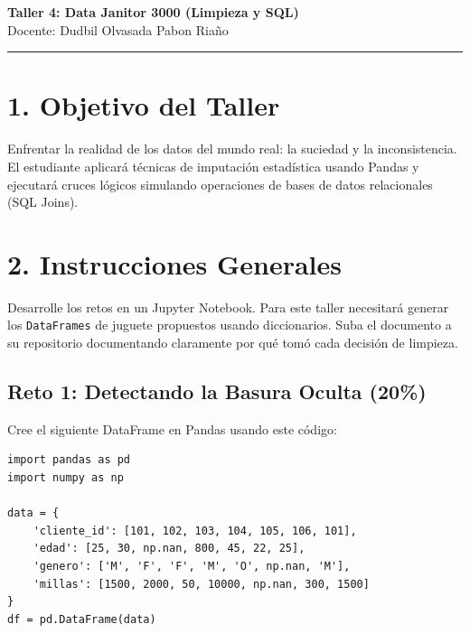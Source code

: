 \documentclass[12pt,a4paper]{article}
\begin{document}
\begin{center}
    {\huge \textcolor{unabblue}{\textbf{Taller 4: Data Janitor 3000 (Limpieza y SQL)}}} \\[0.5cm]
    {\large Docente: Dudbil Olvasada Pabon Riaño} \\[0.2cm]
    \rule{\textwidth}{1pt}
\end{center}

\vspace{0.5cm}

\section*{\textcolor{unabblue}{1. Objetivo del Taller}}
Enfrentar la realidad de los datos del mundo real: la suciedad y la inconsistencia. El estudiante aplicará técnicas de imputación estadística usando Pandas y ejecutará cruces lógicos simulando operaciones de bases de datos relacionales (SQL Joins).

\section*{\textcolor{unabblue}{2. Instrucciones Generales}}
Desarrolle los retos en un Jupyter Notebook. Para este taller necesitará generar los \texttt{DataFrames} de juguete propuestos usando diccionarios. Suba el documento a su repositorio documentando claramente por qué tomó cada decisión de limpieza.

\vspace{0.5cm}
\noindent{}
\vspace{0.5cm}

\subsection*{Reto 1: Detectando la Basura Oculta (20\%)}
Cree el siguiente DataFrame en Pandas usando este código:
\begin{verbatim}
import pandas as pd
import numpy as np

data = {
    'cliente_id': [101, 102, 103, 104, 105, 106, 101],
    'edad': [25, 30, np.nan, 800, 45, 22, 25],
    'genero': ['M', 'F', 'F', 'M', 'O', np.nan, 'M'],
    'millas': [1500, 2000, 50, 10000, np.nan, 300, 1500]
}
df = pd.DataFrame(data)
\end{verbatim}
\end{document}
